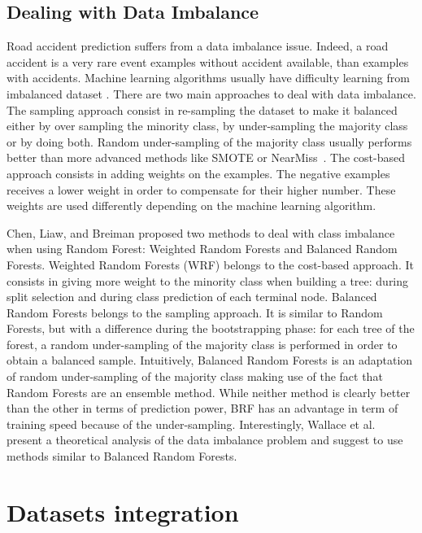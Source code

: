 \documentclass[conference]{IEEEtran}
\newcommand{\english}[1]{\uwave{#1}}  %
\begin{document}
\subsection{Dealing with Data Imbalance}

Road accident prediction suffers from a data imbalance issue. Indeed, a road
accident is a very rare event \english{so we have many more} examples without accident
available, than examples with accidents. Machine learning algorithms usually
have difficulty learning from imbalanced dataset \cite{Branco2016}.
There are two main approaches to deal with data imbalance. The sampling approach
consist in re-sampling the dataset to make it balanced either by over sampling the
minority class, by under-sampling the majority class or by doing both.
Random under-sampling of the majority class usually performs better than
more advanced methods like SMOTE or NearMiss~\cite{Branco2016}.
The cost-based approach consists in adding weights on the examples. The
negative examples receives a lower weight in order to compensate for their
higher number. These weights are used differently depending on the machine
learning algorithm. 

Chen, Liaw, and Breiman\cite{Chen2004} proposed two methods to deal with class imbalance
when using Random Forest: Weighted Random Forests and Balanced Random Forests.
Weighted Random
Forests (WRF) belongs to the cost-based approach. It consists in giving more weight to the minority class when building a tree: during split selection and during 
class prediction of each terminal node. Balanced Random Forests belongs to the sampling
approach. It is similar to Random Forests, but with a
difference during the bootstrapping phase: for each tree of the forest, a random under-sampling of the
majority class is performed in order to obtain a balanced sample. Intuitively,
Balanced Random Forests is an adaptation of random under-sampling of the majority
class making use of the fact that Random Forests are an ensemble method.
While neither method is clearly better than the other in terms of prediction
power, BRF has an advantage in term of training speed because of the under-sampling. Interestingly, Wallace et al.~\cite{Wallace2011} present a theoretical analysis of the data
imbalance problem and suggest to use methods similar to Balanced Random Forests.

\section{Datasets integration}
\end{document}
